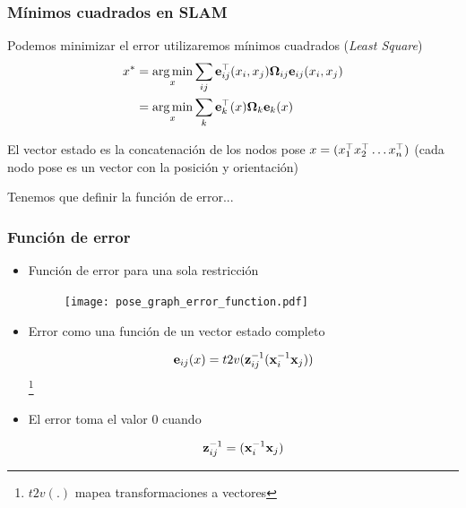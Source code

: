 \begin{frame}
	\frametitle{Mínimos cuadrados en SLAM}
	Podemos minimizar el error utilizaremos mínimos cuadrados (\emph{Least Square})
	\begin{align*}
		x^{*} &= \operatorname*{arg\,min}_{x} \sum_{ij} \boldsymbol{\mathbf{e}}^{\top}_{ij}(x_{i},x_{j}) \boldsymbol{\mathbf{\Omega}}_{ij} \boldsymbol{\mathbf{e}}_{ij}(x_{i},x_{j})\\
	   		  &= \operatorname*{arg\,min}_{x} \sum_{k} \boldsymbol{\mathbf{e}}^{\top}_{k}(x) \boldsymbol{\mathbf{\Omega}}_{k} \boldsymbol{\mathbf{e}}_{k}(x)
	\end{align*}
	
	El vector estado es la concatenación de los nodos pose $x = (x_{1}^{\top} x_{2}^{\top} \dots x_{n}^{\top})$ (cada nodo pose es un vector con la posición y orientación)
	
	Tenemos que definir la función de error...
\end{frame}


\begin{frame}
	\frametitle{Función de error}
    
    \begin{itemize}
    \item Función de error para una sola restricción
       	\begin{figure}
            \texttt{[image: pose\_graph\_error\_function.pdf]}
        \end{figure}
    
    \item Error como una función de un vector estado completo
    
    \begin{equation*}
        \boldsymbol{\mathbf{e}}_{ij}(x) = t2v({\boldsymbol{\mathbf{z}}}^{-1}_{ij}({\boldsymbol{\mathbf{x}}}^{-1}_{i}\boldsymbol{\mathbf{x}}_{j}))
    \end{equation*}\footnote{$t2v(.)$ mapea transformaciones a vectores}

    \item El error toma el valor 0 cuando
    
    \begin{equation*}
        {\boldsymbol{\mathbf{z}}}^{-1}_{ij} = ({\boldsymbol{\mathbf{x}}}^{-1}_{i}\boldsymbol{\mathbf{x}}_{j})
    \end{equation*}
    
    \end{itemize}
    
    
	
\end{frame}

